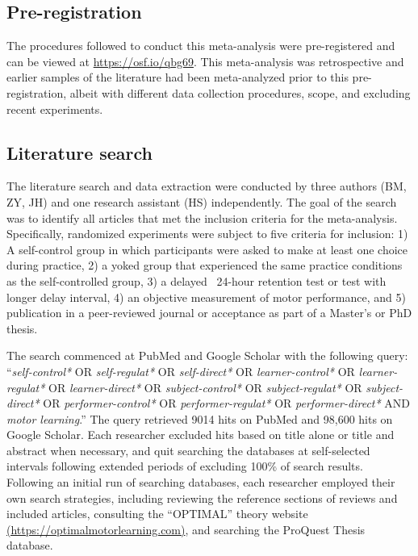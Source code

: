 \documentclass[man,floatsintext,hidelinks]{apa7}
\begin{document}
\subsection{Pre-registration}
The procedures followed to conduct this meta-analysis were pre-registered and can be viewed at \href{https://osf.io/qbg69}{https://osf.io/qbg69}. This meta-analysis was retrospective and earlier samples of the literature had been meta-analyzed prior to this pre-registration, albeit with different data collection procedures, scope, and excluding recent experiments.

\subsection{Literature search}
The literature search and data extraction were conducted by three authors (BM, ZY, JH) and one research assistant (HS) independently. The goal of the search was to identify all articles that met the inclusion criteria for the meta-analysis. Specifically, randomized experiments were subject to five criteria for inclusion: 1) A self-control group in which participants were asked to make at least one choice during practice, 2) a yoked group that experienced the same practice conditions as the self-controlled group, 3) a delayed ~24-hour retention test or test with longer delay interval, 4) an objective measurement of motor performance, and 5) publication in a peer-reviewed journal or acceptance as part of a Master’s or PhD thesis.

The search commenced at PubMed and Google Scholar with the following query: ``\emph{self-control*} OR \emph{self-regulat*} OR \emph{self-direct*} OR \emph{learner-control*} OR \emph{learner-regulat*} OR \emph{learner-direct*} OR \emph{subject-control*} OR \emph{subject-regulat*} OR \emph{subject-direct*} OR \emph{performer-control*} OR \emph{performer-regulat*} OR \emph{performer-direct*} AND \emph{motor learning}.'' The query retrieved 9014 hits on PubMed and 98,600 hits on Google Scholar. Each researcher excluded hits based on title alone or title and abstract when necessary, and quit searching the databases at self-selected intervals following extended periods of excluding 100\% of search results. Following an initial run of searching databases, each researcher employed their own search strategies, including reviewing the reference sections of reviews and included articles, consulting the ``OPTIMAL'' theory website \href{https://optimalmotorlearning.com/index.php/did-you-know-that/}{(https://optimalmotorlearning.com)}, and searching the ProQuest Thesis database. %
\end{document}
